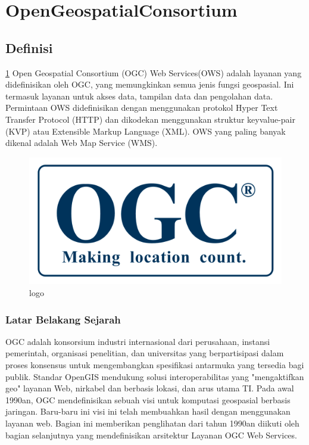 
\section{OpenGeospatialConsortium}

\subsection{Definisi}

\cite{lupp2008open} \ref{ogc} Open Geospatial Consortium (OGC) Web Services(OWS) adalah layanan yang didefinisikan oleh OGC, yang memungkinkan semua jenis fungsi geospasial. Ini termasuk layanan untuk akses data, tampilan data dan pengolahan data. Permintaan OWS didefinisikan dengan menggunakan protokol Hyper Text Transfer Protocol (HTTP) dan dikodekan menggunakan struktur keyvalue-pair (KVP) atau Extensible Markup Language (XML). OWS yang paling banyak dikenal adalah Web Map Service (WMS).

\begin{figure}[ht]
	\centerline{\includegraphics[width=1\textwidth]{figures/ogc.png}}
	\caption{logo}
	\label{ogc}
	\end{figure}

\subsubsection{Latar Belakang Sejarah}

\cite{lupp2008open} OGC adalah konsorsium industri internasional dari perusahaan, instansi pemerintah, organisasi penelitian, dan universitas yang berpartisipasi dalam proses konsensus untuk mengembangkan spesifikasi antarmuka yang tersedia bagi publik. Standar OpenGIS mendukung solusi interoperabilitas yang "mengaktifkan geo" layanan Web, nirkabel dan berbasis lokasi, dan arus utama TI. Pada awal 1990an, OGC mendefinisikan sebuah visi untuk komputasi geospasial berbasis jaringan. Baru-baru ini visi ini telah membuahkan hasil dengan menggunakan layanan web. Bagian ini memberikan penglihatan dari tahun 1990an diikuti oleh bagian selanjutnya yang mendefinisikan arsitektur Layanan OGC Web Services. 

